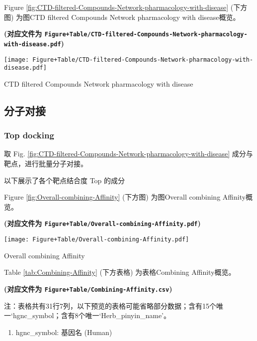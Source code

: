 \documentclass[
]{article}
\providecommand{\tightlist}{%
  \setlength{\itemsep}{0pt}\setlength{\parskip}{0pt}}
\begin{document}
Figure \ref{fig:CTD-filtered-Compounds-Network-pharmacology-with-disease} (下方图) 为图CTD filtered Compounds Network pharmacology with disease概览。

\textbf{(对应文件为 \texttt{Figure+Table/CTD-filtered-Compounds-Network-pharmacology-with-disease.pdf})}

\def\@captype{figure}
\begin{center}
\texttt{[image: Figure+Table/CTD-filtered-Compounds-Network-pharmacology-with-disease.pdf]}
\caption{CTD filtered Compounds Network pharmacology with disease}\label{fig:CTD-filtered-Compounds-Network-pharmacology-with-disease}
\end{center}

\hypertarget{ux5206ux5b50ux5bf9ux63a5}{%
\subsection{分子对接}\label{ux5206ux5b50ux5bf9ux63a5}}

\hypertarget{top-docking}{%
\subsubsection{Top docking}\label{top-docking}}

取 Fig. \ref{fig:CTD-filtered-Compounds-Network-pharmacology-with-disease} 成分与靶点，进行批量分子对接。

以下展示了各个靶点结合度 Top 的成分

Figure \ref{fig:Overall-combining-Affinity} (下方图) 为图Overall combining Affinity概览。

\textbf{(对应文件为 \texttt{Figure+Table/Overall-combining-Affinity.pdf})}

\def\@captype{figure}
\begin{center}
\texttt{[image: Figure+Table/Overall-combining-Affinity.pdf]}
\caption{Overall combining Affinity}\label{fig:Overall-combining-Affinity}
\end{center}

Table \ref{tab:Combining-Affinity} (下方表格) 为表格Combining Affinity概览。

\textbf{(对应文件为 \texttt{Figure+Table/Combining-Affinity.csv})}

\begin{center}\begin{tcolorbox}[colback=gray!10, colframe=gray!50, width=0.9\linewidth, arc=1mm, boxrule=0.5pt]注：表格共有31行7列，以下预览的表格可能省略部分数据；含有15个唯一`hgnc\_symbol；含有8个唯一`Herb\_pinyin\_name'。
\end{tcolorbox}
\end{center}
\begin{center}\begin{tcolorbox}[colback=gray!10, colframe=gray!50, width=0.9\linewidth, arc=1mm, boxrule=0.5pt]\begin{enumerate}\tightlist
\item hgnc\_symbol:  基因名 (Human)
\end{enumerate}\end{tcolorbox}
\end{center}
\end{document}
